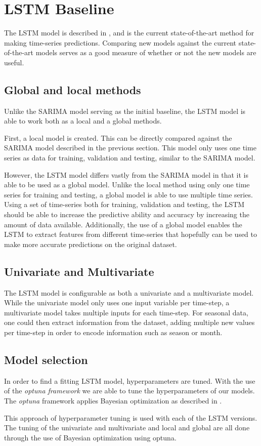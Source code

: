 
\section{LSTM Baseline}
\label{section:Architecture:Baselines:LSTM}

The LSTM model is described in , and is the current state-of-the-art method for making time-series predictions.
Comparing new models against the current state-of-the-art models serves as a good measure of whether or not the new models are useful.

\subsection{Global and local methods}
Unlike the SARIMA model serving as the initial baseline,
the LSTM model is able to work both as a local and a global methods.

First, a local model is created. This can be directly compared against the SARIMA model described in the previous section.
This model only uses one time series as data for training, validation and testing, similar to the SARIMA model.

However, the LSTM model differs vastly from the SARIMA model in that it is able to be used as a global model.
Unlike the local method using only one time series for training and testing,
a global model is able to use multiple time series.
Using a set of time-series both for training, validation and testing,
the LSTM should be able to increase the predictive ability and accuracy by increasing the amount of data available.
Additionally, the use of a global model enables the LSTM to extract features from different time-series that hopefully can be used to make more accurate predictions on the original dataset.

\subsection{Univariate and Multivariate}
The LSTM model is configurable as both a univariate and a multivariate model.
While the univariate model only uses one input variable per time-step, a multivariate model takes multiple inputs for each time-step.
For seasonal data, one could then extract information from the dataset, adding multiple new values per time-step in order to encode information such as season or month.

\subsection{Model selection}
In order to find a fitting LSTM model, hyperparameters are tuned.
With the use of the \textit{optuna framework} %
we are able to tune the hyperparameters of our models.
The \textit{optuna} framework applies Bayesian optimization as described in .

This approach of hyperparameter tuning is used with each of the LSTM versions.
The tuning of the univariate and multivariate and local and global are all done through the use of Bayesian optimization using optuna.


